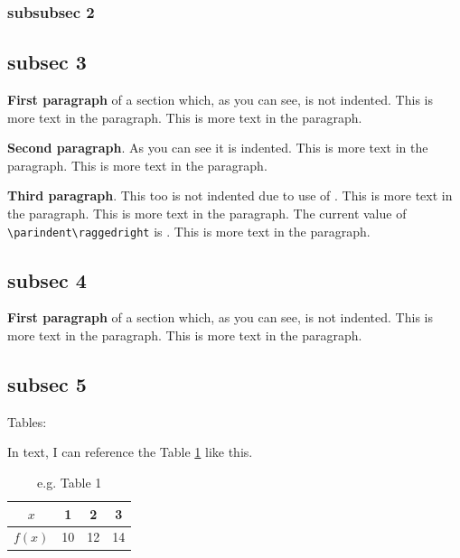 \documentclass{article}
\begin{document}
\subsubsection{subsubsec 2}
\Centering
\blindtext[1]

\vspace{5mm}
\justifying

\blindtext[1]
\lipsum[2]

\setlength{\parindent}{15pt} %
\setlength{\parskip}{0.5em} %

\subsection*{subsec 3}
\textbf{First paragraph} of a section which, as you can see, is not indented. This is more text in the paragraph. This is more text in the paragraph.

\textbf{Second paragraph}. As you can see it is indented. This is more text in the paragraph. This is more text in the paragraph. 

\noindent\textbf{Third paragraph}. This too is not indented due to use of \texttt{\string\noindent}. This is more text in the paragraph. This is more text in the paragraph.  The current value of \verb|\parindent\raggedright| is \the\parindent. This is more text in the paragraph.

\subsection*{subsec 4}
\textbf{First paragraph} of a section which, as you can see, is not indented. This is more text in the paragraph. This is more text in the paragraph.
\lipsum[]

\subsection{subsec 5}

Tables:

In text, I can reference the Table \ref{tab:my_label1} like this.

\begin{table}[ht]
    \centering
    \begin{tabular}{|c||c|c|c|}
    \hline
    $x$     & 1  & 2  & 3  \\ 
    \hline
    $f(x)$  & 10 & 12 & 14 \\ 
    \hline
    \end{tabular}
    \caption{e.g. Table 1}
    \label{tab:my_label1}
\end{table}
\end{document}
